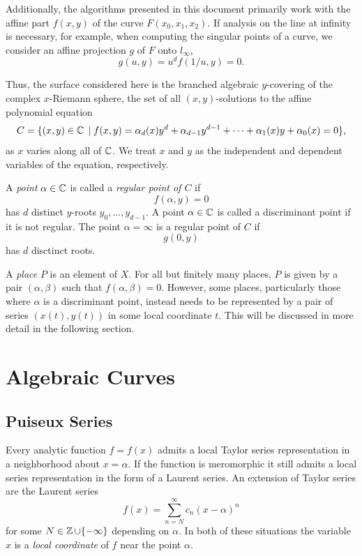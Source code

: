 Additionally, the algorithms presented in this document primarily work with the
affine part $f(x,y)$ of the curve $F(x_0,x_1,x_2)$. If analysis on the line at
infinity is necessary, for example, when computing the singular points of a
curve, we consider an affine projection $g$ of $F$ onto $l_\infty$,
\[
  g(u,y) = u^d f(1/u,y) = 0.
\]

Thus, the surface considered here is the branched algebraic $y$-covering of the
complex $x$-Riemann sphere, the set of all $(x,y)$-solutions to the affine
polynomial equation
\[
    C = \{ (x,y) \in \operatorname{\mathbb{C}} \; | \; f(x,y) = \alpha_d(x)y^d +
    \alpha_{d-1}y^{d-1} + \cdots + \alpha_1(x)y + \alpha_0(x) = 0\},
\]
as $x$ varies along all of $\operatorname{\mathbb{C}}$. We treat $x$ and $y$ as the independent and
dependent variables of the equation, respectively.

A {\it point} $\alpha \in \operatorname{\mathbb{C}}$ is called a {\it regular point of $C$} if
\[
  f(\alpha,y) = 0
\]
has $d$ distinct $y$-roots $y_0,\ldots,y_{d-1}$. A point $\alpha \in \operatorname{\mathbb{C}}$ is
called a discriminant point if it is not regular. The point $\alpha = \infty$ is
a regular point of $C$ if
\[
  g(0,y)
\]
has $d$ disctinct roots.

A {\it place} $P$ is an element of $X$. For all but finitely many places, $P$ is
given by a pair $(\alpha,\beta)$ such that $f(\alpha,\beta) = 0$. However, some
places, particularly those where $\alpha$ is a discriminant point, instead needs
to be represented by a pair of series $(x(t),y(t))$ in some local coordinate
$t$. This will be discussed in more detail in the following section.


\section{Algebraic Curves}\label{sec:background-algebraic-curves}

\subsection{Puiseux Series}\label{subsec:background-puiseux-series}

Every analytic function $f = f(x)$ admits a local Taylor series representation
in a neighborhood about $x = \alpha$. If the function is meromorphic it still
admits a local series representation in the form of a Laurent series. An
extension of Taylor series are the Laurent series
\[
    f(x) = \sum_{n=N}^\infty c_n (x-\alpha)^n
\]
for some $N \in \operatorname{\mathbb{Z}} \cup \{-\infty\}$ depending on $\alpha$. In both of these
situations the variable $x$ is a {\it local coordinate} of $f$ near the point
$\alpha$.

